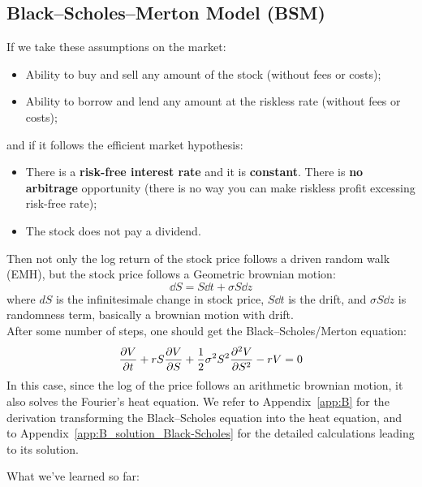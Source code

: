 \subsection{Black--Scholes--Merton Model (BSM)} 
If we take these assumptions on the market:
\begin{itemize}
    \item Ability to buy and sell any amount of the stock (without fees or costs);
    \item Ability to borrow and lend any amount at the riskless rate (without fees or costs);
    \end{itemize}
    and if it follows the efficient market hypothesis:
    \begin{itemize}
    \item There is a \textbf{risk-free interest rate} and it is \textbf{constant}. There is \textbf{no arbitrage} opportunity (there is no way you can make riskless profit excessing risk-free rate);
    \item The stock does not pay a dividend.
    \end{itemize}
Then not only the log return of the stock price follows a driven random walk (EMH), but the stock price follows a Geometric brownian motion:
\begin{equation*}
    \dd S = S \dd t + \sigma S \dd z
\end{equation*}
where $dS$ is the infinitesimale change in stock price, $S \dd t$ is the drift, and $\sigma S \dd z$ is randomness term, basically a brownian motion with drift.\\

After some number of steps, one should get the Black--Scholes/Merton equation:
\begin{equation} \label{eq:Black–Scholes}
    \pdv{V}{t} + rS \pdv{V}{S} + \frac{1}{2} \sigma^2 S^2 \pdv[2]{V}{S} - rV = 0
\end{equation}
In this case, since the log of the price follows an arithmetic brownian motion, it also solves the Fourier's heat equation.
We refer to Appendix~\ref{app:B} for the derivation transforming the Black--Scholes equation into the heat equation, and to Appendix~\ref{app:B_solution_Black-Scholes} for the detailed calculations leading to its solution.

What we've learned so far:

